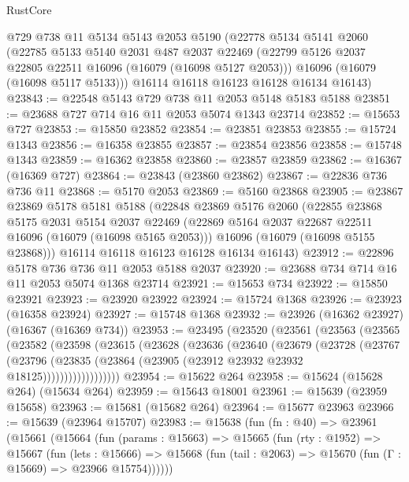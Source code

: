 \begin{lexlean}{RustCore}
\begin{coremodule}
    @729
    @738
    @11
    @5134
    @5143
    @2053
    @5190
    (@22778
      @5134
      @5141
      @2060
      (@22785
        @5133
        @5140
        @2031
        @487
        @2037
        @22469
        (@22799 @5126 @2037 @22805 @22511 @16096 (@16079 (@16098 @5127 @2053)))
        @16096
        (@16079 (@16098 @5117 @5133)))
      @16114
      @16118
      @16123
      @16128
      @16134
      @16143)
@23843 := @22548 @5143 @729 @738 @11 @2053 @5148 @5183 @5188
@23851 := @23688 @727 @714 @16 @11 @2053 @5074 @1343 @23714
@23852 := @15653 @727
@23853 := @15850 @23852
@23854 := @23851 @23853
@23855 := @15724 @1343
@23856 := @16358 @23855
@23857 := @23854 @23856
@23858 := @15748 @1343
@23859 := @16362 @23858
@23860 := @23857 @23859
@23862 := @16367 (@16369 @727)
@23864 := @23843 (@23860 @23862)
@23867 := @22836 @736 @736 @11
@23868 := @5170 @2053
@23869 := @5160 @23868
@23905 := @23867
    @23869
    @5178
    @5181
    @5188
    (@22848
      @23869
      @5176
      @2060
      (@22855
        @23868
        @5175
        @2031
        @5154
        @2037
        @22469
        (@22869 @5164 @2037 @22687 @22511 @16096 (@16079 (@16098 @5165 @2053)))
        @16096
        (@16079 (@16098 @5155 @23868)))
      @16114
      @16118
      @16123
      @16128
      @16134
      @16143)
@23912 := @22896 @5178 @736 @736 @11 @2053 @5188 @2037
@23920 := @23688 @734 @714 @16 @11 @2053 @5074 @1368 @23714
@23921 := @15653 @734
@23922 := @15850 @23921
@23923 := @23920 @23922
@23924 := @15724 @1368
@23926 := @23923 (@16358 @23924)
@23927 := @15748 @1368
@23932 := @23926 (@16362 @23927) (@16367 (@16369 @734))
@23953 := @23495
    (@23520
      (@23561
        (@23563
          (@23565
            (@23582
              (@23598
                (@23615
                  (@23628
                    (@23636
                      (@23640
                        (@23679
                          (@23728
                            (@23767
                              (@23796
                                (@23835
                                  (@23864 (@23905 (@23912 @23932 @23932 @18125))))))))))))))))))
@23954 := @15622 @264
@23958 := @15624 (@15628 @264) (@15634 @264)
@23959 := @15643 @18001
@23961 := @15639 (@23959 @15658)
@23963 := @15681 (@15682 @264)
@23964 := @15677 @23963
@23966 := @15639 (@23964 @15707)
@23983 := @15638
    (fun (fn : @40) =>
    @23961
      (@15661
        (@15664
          (fun (params : @15663) =>
          @15665
            (fun (rty : @1952) =>
            @15667
              (fun (lets : @15666) =>
              @15668 (fun (tail : @2063) => @15670 (fun (Γ : @15669) => @23966 @15754))))))

\end{coremodule}
\end{lexlean}
